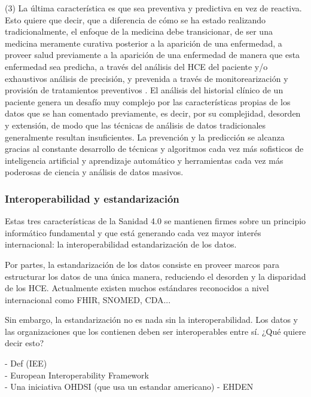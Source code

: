 
(3) La última característica es que sea preventiva y predictiva en vez de reactiva. Esto quiere que decir, que a diferencia de cómo se ha estado realizando tradicionalmente, el enfoque de la medicina debe transicionar, de ser una medicina meramente curativa posterior a la aparición de una enfermedad, a proveer salud previamente a la aparición de una enfermedad de manera que esta enfermedad sea predicha, a través del análisis del HCE del paciente y/o exhaustivos análisis de precisión, y prevenida a través de monitorearización y provisión de tratamientos preventivos \cite{ruiz2023inteligencia}. El análisis del historial clínico de un paciente genera un desafío muy complejo por las características propias de los datos que se han comentado previamente, es decir, por su complejidad, desorden y extensión, de modo que las técnicas de análisis de datos tradicionales generalmente resultan insuficientes. La prevención y la predicción se alcanza gracias al constante desarrollo de técnicas y algoritmos cada vez más sofisticos de inteligencia artificial y aprendizaje automático y herramientas cada vez más poderosas de ciencia y análisis de datos masivos.


\subsubsection{Interoperabilidad y estandarización}

Estas tres características de la Sanidad 4.0 se mantienen firmes sobre un principio informático fundamental y que está generando cada vez mayor interés internacional: la interoperabilidad estandarización de los datos.

Por partes, la estandarización de los datos consiste en proveer marcos para estructurar los datos de una única manera, reduciendo el desorden y la disparidad de los HCE. Actualmente existen muchos estándares reconocidos a nivel internacional como FHIR, SNOMED, CDA...

Sin embargo, la estandarización no es nada sin la interoperabilidad. Los datos y las organizaciones que los contienen deben ser interoperables entre sí. ¿Qué quiere decir esto?

    - Def (IEE)\\
    - European Interoperability Framework\\
    - Una iniciativa OHDSI (que usa un estandar americano) - EHDEN\\

